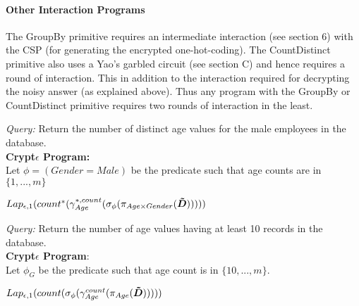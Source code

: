 \paragraph{\textbf{Other Interaction Programs}}
 The \textsf{GroupBy} primitive requires an intermediate interaction (see section 6) with the \textsf{CSP} (for generating the encrypted one-hot-coding). The \textsf{CountDistinct} primitive also uses a Yao's garbled circuit (see section C) and hence requires a round of interaction. This in addition to the interaction required for decrypting the noisy answer (as explained above). Thus any program with the \textsf{GroupBy} or \textsf{CountDistinct} primitive requires two rounds of interaction in the least. 
\begin{exmp}\textit{Query:} Return the number of distinct age values for the male employees in the database. \\ \textbf{Crypt$\epsilon$ Program:} \\Let  $\phi=(Gender=Male)$ be the predicate such that age counts are in $\{1,...,m\}$\end{exmp} $Lap_{\epsilon,1}(count^*(\gamma^{*,count}_{Age}(\sigma_{\phi}(\pi_{Age \times Gender}(\boldsymbol{\tilde{D}})))))$ %
\begin{exmp}\textit{Query: } Return the number of  age values having at least 10 records in the database. \\ \textbf{Crypt$\epsilon$ Program}:\\ Let $\phi_G$ be the predicate such that age count is in $\{10,...,m\}$. \end{exmp}
$Lap_{\epsilon,1}(count(\sigma_{\phi}(\gamma^{count}_{Age}(\pi_{Age}(\boldsymbol{\tilde{D}})))))$
